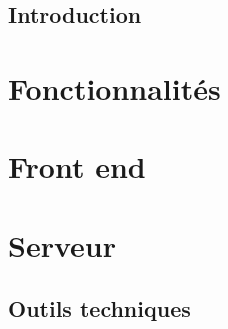 

\subsection{Introduction}


\section*{Fonctionnalités}






\section*{Front end}
\subsection{}


\section*{Serveur}


\subsection{Outils techniques}


